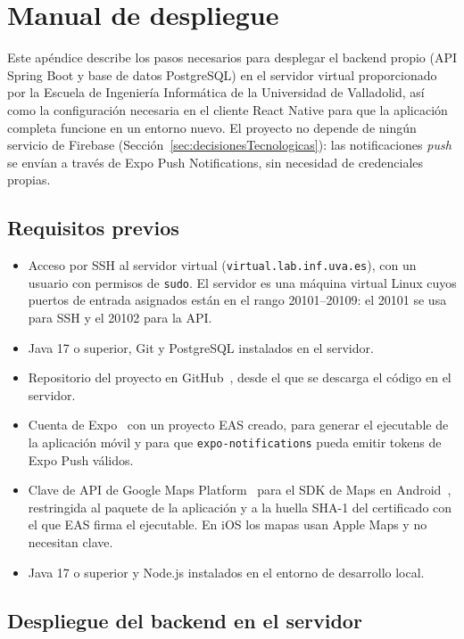 \chapter{Manual de despliegue}\label{cap:manual_despliegue}

Este apéndice describe los pasos necesarios para desplegar el backend propio (API Spring Boot y base de datos PostgreSQL) en el servidor virtual proporcionado por la Escuela de Ingeniería Informática de la Universidad de Valladolid, así como la configuración necesaria en el cliente React Native para que la aplicación completa funcione en un entorno nuevo. El proyecto no depende de ningún servicio de Firebase (Sección~\ref{sec:decisionesTecnologicas}): las notificaciones \emph{push} se envían a través de Expo Push Notifications, sin necesidad de credenciales propias.

\section{Requisitos previos}

\begin{itemize}
    \item Acceso por SSH al servidor virtual (\texttt{virtual.lab.inf.uva.es}), con un usuario con permisos de \texttt{sudo}. El servidor es una máquina virtual Linux cuyos puertos de entrada asignados están en el rango 20101--20109: el 20101 se usa para SSH y el 20102 para la API.
    \item Java 17 o superior, Git y PostgreSQL instalados en el servidor.
    \item Repositorio del proyecto en GitHub~\cite{github}, desde el que se descarga el código en el servidor.
    \item Cuenta de Expo~\cite{expo} con un proyecto EAS creado, para generar el ejecutable de la aplicación móvil y para que \texttt{expo-notifications} pueda emitir tokens de Expo Push válidos.
    \item Clave de API de Google Maps Platform~\cite{googlemapsapi} para el SDK de Maps en Android~\cite{googlemapsandroid}, restringida al paquete de la aplicación y a la huella SHA-1 del certificado con el que EAS firma el ejecutable. En iOS los mapas usan Apple Maps y no necesitan clave.
    \item Java 17 o superior y Node.js instalados en el entorno de desarrollo local.
\end{itemize}

\section{Despliegue del backend en el servidor}

